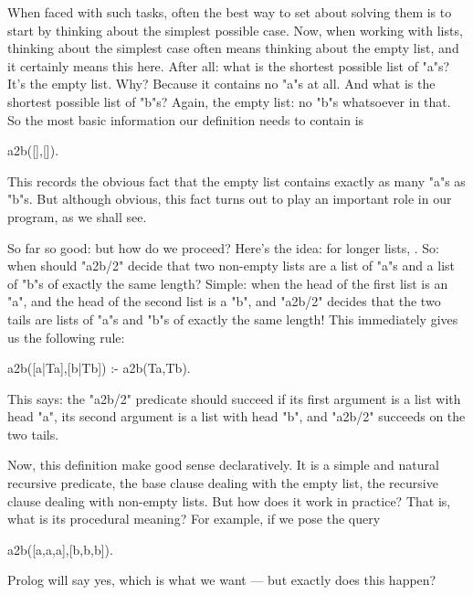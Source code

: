 When faced with such tasks, often the best way to set about solving
them is to start by thinking about the simplest possible case. Now,
when working with lists, thinking about the simplest case often means
thinking about the empty list, and it certainly means this here.
After all: what is the shortest possible list of "a"s?  It's the empty
list. Why? Because it contains no "a"s at all. And what is the
shortest possible list of "b"s? Again, the empty list: no "b"s
whatsoever in that.  So the most basic information our definition
needs to contain is
\begin{LPNcodedisplay}
a2b([],[]).
\end{LPNcodedisplay}
This records the obvious fact that the empty list contains exactly as
many "a"s as "b"s. But although obvious, this fact turns out
to play an important role in our program, as we shall see.

 So far so good: but how do we proceed? Here's the idea: for longer
lists, . So: when should "a2b/2"
decide that two non-empty lists are a list of "a"s and a list of
"b"s of exactly the same length? Simple: when the head of the
first list is an "a", and the head of the second list is a
"b", and "a2b/2" decides that the two tails are lists
of "a"s and "b"s of exactly the same length!  This
immediately gives us the following rule:
\begin{LPNcodedisplay}
a2b([a|Ta],[b|Tb]) :- a2b(Ta,Tb).
\end{LPNcodedisplay}
This says: the "a2b/2" predicate should succeed if its
first argument is a list with head "a", its second argument is a
list with head "b", and "a2b/2" succeeds on the two
tails.

Now, this definition make good sense declaratively. It is a simple and
natural recursive predicate, the base clause dealing with the empty
list, the recursive clause dealing with non-empty lists.  But how does
it work in practice? That is, what is its procedural meaning?  For
example, if we pose the query
\begin{LPNcodedisplay}
a2b([a,a,a],[b,b,b]).
\end{LPNcodedisplay}
Prolog will say yes, which is what we want --- but  exactly does
this happen?

